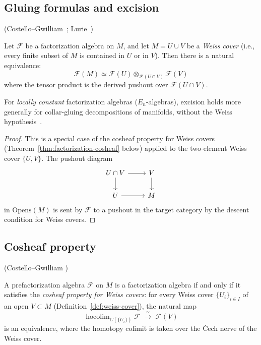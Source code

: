 \subsection{Gluing formulas and excision}

\begin{theorem}
\label{thm:excision-factorization}
\textup{(Costello--Gwilliam~\cite[§6.3]{CG17}; Lurie~\cite[Theorem~5.5.3.11]{HA})}

Let $\mathcal{F}$ be a factorization algebra on $M$, and let
$M = U \cup V$ be a \emph{Weiss cover} (i.e., every finite subset of $M$ is contained in $U$ or in $V$). Then there is a natural equivalence:
\[\mathcal{F}(M) \simeq \mathcal{F}(U) \otimes_{\mathcal{F}(U \cap V)} \mathcal{F}(V)\]
where the tensor product is the derived pushout over $\mathcal{F}(U \cap V)$.

For \emph{locally constant} factorization algebras ($E_n$-algebras), excision holds more generally for collar-gluing decompositions of manifolds, without the Weiss hypothesis~\cite[Theorem~5.5.3.11]{HA}.
\end{theorem}

\begin{proof}
This is a special case of the cosheaf property for Weiss covers
(Theorem~\ref{thm:factorization-cosheaf} below) applied to the
two-element Weiss cover $\{U, V\}$.  The pushout diagram
\[\begin{tikzcd}
U \cap V \arrow[r] \arrow[d] & V \arrow[d] \\
U \arrow[r] & M
\end{tikzcd}\]
in $\mathrm{Opens}(M)$ is sent by $\mathcal{F}$ to a pushout in the target
category by the descent condition for Weiss covers.
\end{proof}

\subsection{Cosheaf property}

\begin{theorem}
\label{thm:factorization-cosheaf}
\textup{(Costello--Gwilliam \cite[Theorem~6.3.1]{CG17})}

A prefactorization algebra $\mathcal{F}$ on $M$ is a factorization algebra
if and only if it satisfies the \emph{cosheaf property for Weiss covers}:
for every Weiss cover $\{U_i\}_{i \in I}$ of an open $V \subset M$
(Definition~\ref{def:weiss-cover}), the natural map
\[\operatorname{hocolim}_{\check{C}(\{U_i\})}
   \mathcal{F} \;\xrightarrow{\;\sim\;}\; \mathcal{F}(V)\]
is an equivalence, where the homotopy colimit is taken over the
\v{C}ech nerve of the Weiss cover.
\end{theorem}

